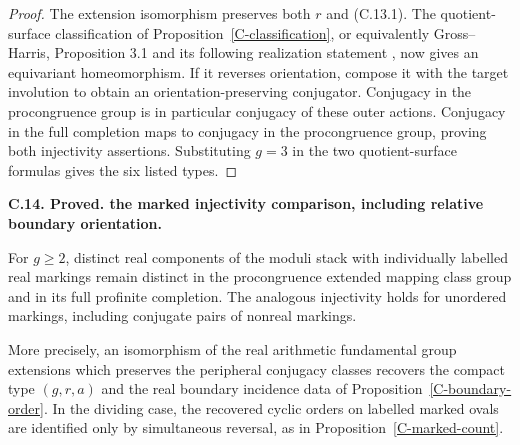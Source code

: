 \documentclass[11pt,oneside]{article}
\makeatletter
\newcounter{statementanchor}
\newenvironment{statement}[3]{%
 \refstepcounter{statementanchor}\def\@currentlabel{#1}%
 \par\addvspace{9pt}\noindent
 \textbf{#1. #2. #3.}\par\nobreak\noindent\ignorespaces
}{\par\addvspace{5pt}}
\makeatother
\begin{document}
\begin{proof}
The extension isomorphism preserves both $r$ and (C.13.1).
The quotient-surface classification of
Proposition~\ref{C-classification}, or equivalently Gross--Harris,
Proposition 3.1 and its following realization statement
\cite{GrossHarris1981}, now gives an equivariant homeomorphism.
If it reverses orientation, compose it with the target involution
to obtain an orientation-preserving conjugator. Conjugacy in the
procongruence group is in particular conjugacy of these outer
actions. Conjugacy in the full completion maps to conjugacy in the
procongruence group, proving both injectivity assertions. Substituting
$g=3$ in the two quotient-surface formulas gives the six listed types.
\end{proof}


\begin{statement}{C.14}{Proved}{the marked injectivity comparison, including relative boundary orientation}
\label{st:C.14}
\label{C-marked-injectivity}
For $g\geq2$, distinct real components of the moduli stack with
individually labelled real markings remain distinct in the
procongruence extended mapping class group and in its full profinite
completion. The analogous injectivity holds for unordered markings,
including conjugate pairs of nonreal markings.

More precisely, an isomorphism of the real arithmetic fundamental
group extensions which preserves the peripheral conjugacy classes
recovers the compact type $(g,r,a)$ and the real boundary incidence
data of Proposition~\ref{C-boundary-order}. In the dividing case,
the recovered cyclic orders on labelled marked ovals are identified
only by simultaneous reversal, as in
Proposition~\ref{C-marked-count}.
\end{statement}
\end{document}
